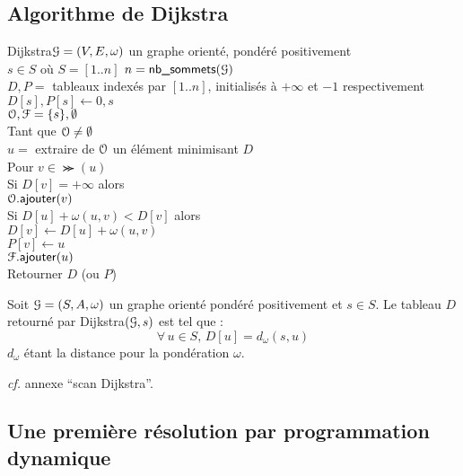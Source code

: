 	\subsection{Algorithme de Dijkstra}
	
		\begin{algo}{Dijkstra}{\(\EuScript{G} = (V,E,\omega)\) un graphe orienté, pondéré positivement \\ \entspace \(s\in S\) où \(S = [1..n]\)}{}{}
			\(n = \text{\textsf{nb\_sommets}}(\EuScript{G})\) \\
			\(D,P = \) tableaux indexés par \([1..n]\), initialisés à \(+\infty\) et \(-1\) respectivement \\
			\(D[s], P[s] \gets 0, s\) \\
			\(\EuScript{O}, \EuScript{F} = \{s\}, \emptyset\) \\
			Tant que \(\EuScript{O} \neq \emptyset\) \\ \Indp
				\(u = \) extraire de \(\EuScript{O}\) un élément minimisant \(D\)  \\
				Pour \(v\in\Succ(u)\) \\ \Indp
					Si \(D[v] = +\infty\) alors  \\ \Indp
						\(\EuScript{O}.\text{\textsf{ajouter}}(v)\) \\ \Indm
					Si \(D[u] + \omega(u,v) < D[v]\) alors \\ \Indp
						\(D[v] \gets D[u] + \omega(u,v)\) \\
						\(P[v] \gets u\) \\ \Indm \Indm
				\(\EuScript{F}.\text{\textsf{ajouter}}(u)\) \\ \Indm
			Retourner \(D\) (ou \(P\))
		\end{algo}
	
		\begin{Propriete}
			Soit \(\EuScript{G} = (S,A,\omega)\) un graphe orienté pondéré positivement et \(s\in S\). Le tableau \(D\) retourné par \textsf{Dijkstra}\((\EuScript{G},s)\) est tel que :
				\[
					\forall\,u \in S,\,D[u] = d_\omega(s,u)
				\]
			\(d_\omega\) étant la distance pour la pondération \(\omega\).
		\end{Propriete}
	
		\begin{Preuve}
			\emph{cf.} annexe ``scan Dijkstra''.
		\end{Preuve}
	
	\subsection{Une première résolution par programmation dynamique}
	
